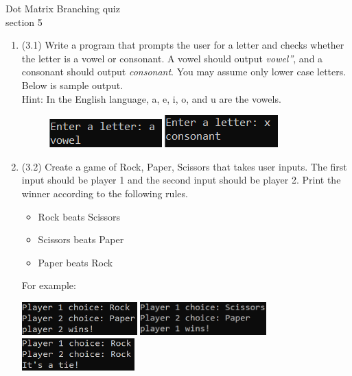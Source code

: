 \documentclass{article}
\newcommand{\csq}[1]{\reflectbox{''}#1''}  %
\begin{document}
\pagebreak
Dot Matrix \hfill Branching quiz\\
section 5\\
\begin{enumerate}
\item (3.1)  
		Write a program that prompts the user for a letter and checks whether the letter is a vowel 
		or consonant.  A vowel should output \textit{\csq{vowel}}, and a consonant should output 
		\textit{consonant}.  You may assume only lower case letters. Below is sample output.\\
		Hint: In the English language, a, e, i, o, and u are the vowels.
	
		\begin{figure}[h]
		\centering
			\begin{minipage}{.5\textwidth}
			\centering
				\includegraphics[scale=1.2]{./imgs/vowelYesAlt.png}
			\end{minipage}%
			\begin{minipage}{.5\textwidth}
			\centering
				\includegraphics[scale=1.1]{./imgs/vowelNoAlt.png}
			\end{minipage}
		\end{figure}





\item (3.2)  
		Create a game of Rock, Paper, Scissors that takes user inputs.  
		The first input should be player 1 and the second 
		input should be player 2.  Print the winner according to the following rules. 
		\begin{itemize}
			\item Rock beats Scissors
			\item Scissors beats Paper
			\item Paper beats Rock
		\end{itemize}		
		For example:

		\hfill 
		\includegraphics[height = 0.5in]{./imgs/RockPaperScissors1.PNG} \hfill 
		\includegraphics[height = 0.5in]{./imgs/RockPaperScissors2.PNG} \hfill  
		\includegraphics[height = 0.5in]{./imgs/RockPaperScissors3.PNG} \hfill \ 



\end{enumerate}
\end{document}
